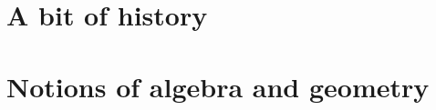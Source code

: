 \documentclass{llncs}
\begin{document}
    \maketitle
    \clearpage

    \section{A bit of history}
    

    \section{Notions of algebra and geometry}
    
\end{document}

